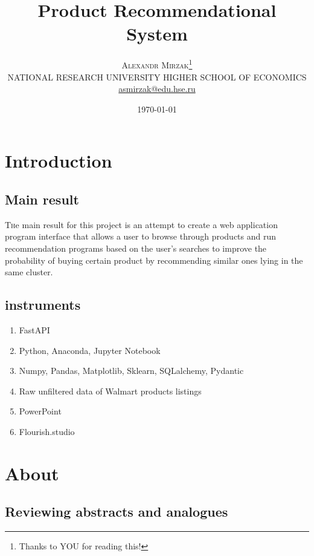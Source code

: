 \documentclass[twoside,twocolumn]{article}
\title{Product Recommendational System} %
\author{%
\textsc{Alexandr Mirzak}\thanks{Thanks to YOU for reading this!} \\[1ex] %
\normalsize NATIONAL RESEARCH UNIVERSITY HIGHER
SCHOOL OF ECONOMICS
 \\ %
\normalsize \href{mailto:asmirzak@edu.hse.ru}{asmirzak@edu.hse.ru}
}
\date{\today}
\begin{document}
\Large\tableofcontents


\maketitle



\section{Introduction}
\subsection{Main result}

\lettrine[nindent=0em,lines=3]{T}  he main result for this project is an attempt to create a web application
program interface that allows a user to browse through products and run
recommendation programs based on the user’s searches to improve the
probability of buying certain product by recommending similar ones
lying in the same cluster.

\subsection{instruments}
\begin{enumerate}
    \item FastAPI
    \item Python, Anaconda, Jupyter Notebook
    \item Numpy, Pandas, Matplotlib, Sklearn, SQLalchemy, Pydantic
    \item Raw unfiltered data of Walmart products listings
    \item PowerPoint
    \item Flourish.studio

\end{enumerate}


\section{About}

\subsection{Reviewing abstracts and analogues}
\end{document}
